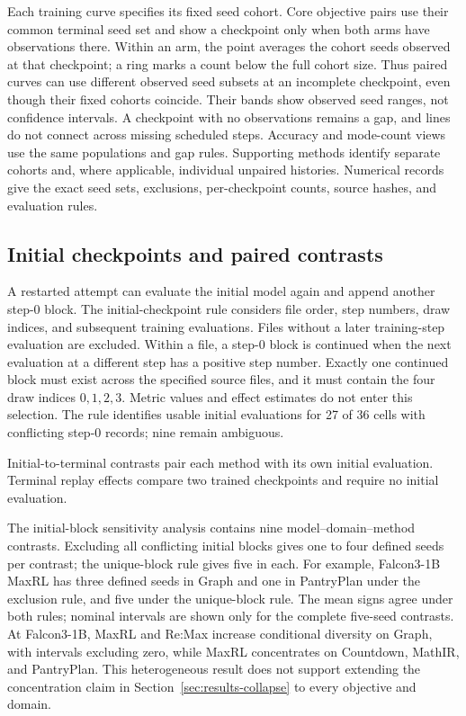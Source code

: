 \documentclass{article}
\newcommand{\1}{\mathbf 1}
\theoremstyle{remark}
\theoremstyle{definition}
\theoremstyle{plain}
\begin{document}
Each training curve specifies its fixed seed cohort. Core objective pairs
use their common terminal seed set and show a checkpoint only when both
arms have observations there. Within an arm, the point averages the cohort
seeds observed at that checkpoint; a ring marks a count below the full
cohort size. Thus paired curves can use different observed seed subsets at
an incomplete checkpoint, even though their fixed cohorts coincide.
Their bands show observed seed ranges, not confidence intervals.
A checkpoint with no observations remains a gap, and lines do not connect
across missing scheduled steps. Accuracy and mode-count views use the
same populations and gap rules. Supporting methods identify separate
cohorts and, where applicable, individual unpaired histories. Numerical
records give the exact seed sets, exclusions, per-checkpoint counts,
source hashes, and evaluation rules.

\subsection{Initial checkpoints and paired contrasts}
\label{app:initial-provenance}

A restarted attempt can evaluate the initial model again and append
another step-0 block. The initial-checkpoint rule considers file order,
step numbers, draw indices, and subsequent training evaluations. Files
without a later training-step evaluation are excluded. Within a file,
a step-0 block is continued when the next evaluation at a different step
has a positive step number. Exactly one continued block must exist across
the specified source files, and it must contain the four draw indices
$0,1,2,3$. Metric values and effect estimates do not enter this selection.
The rule identifies usable initial evaluations for 27 of 36 cells with
conflicting step-0 records; nine remain ambiguous.

Initial-to-terminal contrasts pair each method with its own initial
evaluation. Terminal replay effects compare two trained checkpoints and
require no initial evaluation.

The initial-block sensitivity analysis contains nine model--domain--method
contrasts. Excluding all conflicting initial blocks gives one to four
defined seeds per contrast; the unique-block rule gives five in each.
For example, Falcon3-1B MaxRL has three defined seeds in Graph and one
in PantryPlan under the exclusion rule, and five under the unique-block
rule. The mean signs agree under both rules; nominal intervals are shown
only for the complete five-seed contrasts. At Falcon3-1B, MaxRL and
Re:Max increase conditional diversity on Graph, with intervals excluding
zero, while MaxRL concentrates on Countdown, MathIR, and PantryPlan.
This heterogeneous result does not support extending the concentration
claim in Section~\ref{sec:results-collapse} to every objective and domain.
\end{document}
